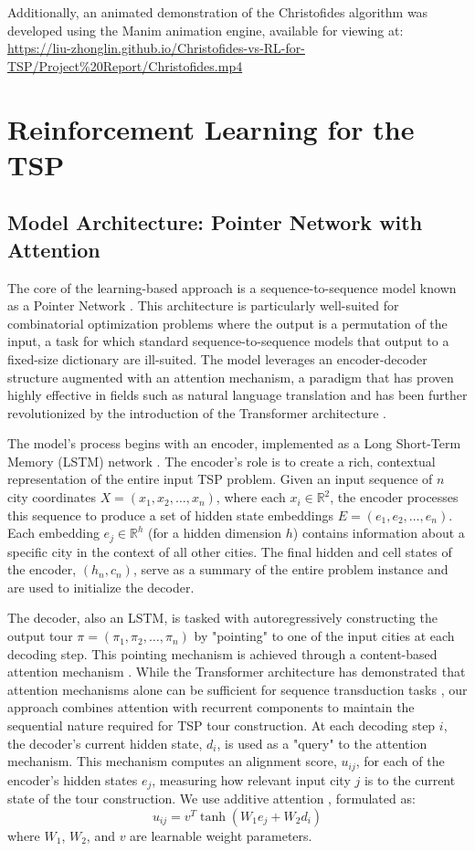 \documentclass[12pt]{article}
\theoremstyle{remarkstyle}
\begin{document}
	Additionally, an animated demonstration of the Christofides algorithm was developed using the Manim animation engine, available for viewing at: \url{https://liu-zhonglin.github.io/Christofides-vs-RL-for-TSP/Project%20Report/Christofides.mp4}
	
	
\section{Reinforcement Learning for the TSP}

\subsection{Model Architecture: Pointer Network with Attention}
The core of the learning-based approach is a sequence-to-sequence model known as a Pointer Network \cite{vinyals2015pointer}. This architecture is particularly well-suited for combinatorial optimization problems where the output is a permutation of the input, a task for which standard sequence-to-sequence models that output to a fixed-size dictionary are ill-suited. The model leverages an encoder-decoder structure augmented with an attention mechanism, a paradigm that has proven highly effective in fields such as natural language translation \cite{bahdanau2014neural} and has been further revolutionized by the introduction of the Transformer architecture \cite{vaswani2017attention}.

The model's process begins with an encoder, implemented as a Long Short-Term Memory (LSTM) network \cite{hochreiter1997long}. The encoder's role is to create a rich, contextual representation of the entire input TSP problem. Given an input sequence of $n$ city coordinates $X = (x_1, x_2, \dots, x_n)$, where each $x_i \in \mathbb{R}^2$, the encoder processes this sequence to produce a set of hidden state embeddings $E = (e_1, e_2, \dots, e_n)$. Each embedding $e_j \in \mathbb{R}^h$ (for a hidden dimension $h$) contains information about a specific city in the context of all other cities. The final hidden and cell states of the encoder, $(h_n, c_n)$, serve as a summary of the entire problem instance and are used to initialize the decoder.

The decoder, also an LSTM, is tasked with autoregressively constructing the output tour $\pi = (\pi_1, \pi_2, \dots, \pi_n)$ by "pointing" to one of the input cities at each decoding step. This pointing mechanism is achieved through a content-based attention mechanism \cite{luong2015effective}. While the Transformer architecture has demonstrated that attention mechanisms alone can be sufficient for sequence transduction tasks \cite{vaswani2017attention}, our approach combines attention with recurrent components to maintain the sequential nature required for TSP tour construction. At each decoding step $i$, the decoder's current hidden state, $d_i$, is used as a "query" to the attention mechanism. This mechanism computes an alignment score, $u_{ij}$, for each of the encoder's hidden states $e_j$, measuring how relevant input city $j$ is to the current state of the tour construction. We use additive attention \cite{bahdanau2014neural}, formulated as:
$$ u_{ij} = v^T \tanh(W_1 e_j + W_2 d_i) $$
where $W_1$, $W_2$, and $v$ are learnable weight parameters.
\end{document}
